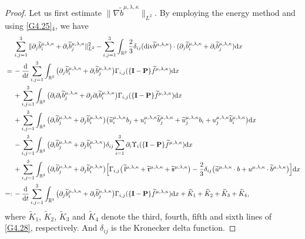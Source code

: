 \documentclass[reqno,11pt]{amsart}
\theoremstyle{plain}
\numberwithin{equation}{section}
\begin{document}
\begin{proof}
Let us first estimate $\|\nabla \widetilde{b}^{\mu,\lambda,\kappa}\|_{L^2}$. 
By employing the energy method and using \eqref{G4.25}$_4$, we have
\begin{align}\label{G4.28}
& \sum_{i, j=1}^3  \|  \partial_j \widetilde{b}^{\mu,\lambda,\kappa}_i+\partial_i
 \widetilde{b}^{\mu,\lambda,\kappa}_j  \|_{L^2}^2-\sum_{i, j=1}^3 \int_{\mathbb{R}^3} \frac{2}{3} \delta_{i j}   ({\rm div} 
 \widetilde{b}^{\mu,\lambda,\kappa})\cdot  
  (\partial_j \widetilde{b}^{\mu,\lambda,\kappa}_i
  +\partial_i \widetilde{b}^{\mu,\lambda,\kappa}_j ) \mathrm{d} x \nonumber\\
  =\,& -\frac{\mathrm{d}}{\mathrm{d} t} 
  \sum_{i, j=1}^3 \int_{\mathbb{R}^3}  
  \big(\partial_j \widetilde{b}^{\mu,\lambda,\kappa}_i
  +\partial_i \widetilde{b}^{\mu,\lambda,\kappa}_j \big)  
   \Gamma_{i, j}(\{\mathbf{I}-\mathbf{P}\} \widetilde{f}^{\mu,\lambda,\kappa}) \mathrm{d} x \nonumber\\
&  +\sum_{i, j=1}^3 \int_{\mathbb{R}^3}  
\big(\partial_i \partial_t \widetilde{b}^{\mu,\lambda,\kappa}_j
+\partial_j \partial_t \widetilde{b}^{\mu,\lambda,\kappa}_i\big)  
 \Gamma_{i, j}(\{\mathbf{I}-\mathbf{P}\} \widetilde{f}^{\mu,\lambda,\kappa}) \mathrm{d} x \nonumber\\
&   +\sum_{i, j=1}^3 \int_{\mathbb{R}^3}  
 \big(\partial_i \widetilde{b}^{\mu,\lambda,\kappa}_j+\partial_j 
 \widetilde{b}^{\mu,\lambda,\kappa}_i \big)   \big(\widetilde{u}^{\mu,\lambda,\kappa}_i 
 b_j+u^{\mu,\lambda,\kappa}_i \widetilde{b}^{\mu,\lambda,\kappa}_j
 +\widetilde{u}^{\mu,\lambda,\kappa}_j b_i+u^{\mu,\lambda,\kappa}_j\widetilde{b}^{\mu,\lambda,
 \kappa}_i \big) {\rm d}x\nonumber \\
&   -\sum_{i, j=1}^3 \int_{\mathbb{R}^3}  
 \big(\partial_i \widetilde{b}^{\mu,\lambda,\kappa}_j+\partial_j 
 \widetilde{b}^{\mu,\lambda,\kappa}_i \big)   \delta_{i j}\sum_{i=1}^3 \partial_i 
 \Upsilon_i(\{\mathbf{I}-\mathbf{P}\} \widetilde{f}^{\mu,\lambda,\kappa}){\rm d}x\nonumber \\
&   +\sum_{i, j=1}^3 \int_{\mathbb{R}^3}  
 \big(\partial_i \widetilde{b}^{\mu,\lambda,\kappa}_j+\partial_j 
 \widetilde{b}^{\mu,\lambda,\kappa}_i \big)  \Big[\Gamma_{i, j}
 \big(\,\widetilde{\mathfrak{l}}^{\mu,\lambda,\kappa}+\widetilde{\mathfrak{r}}^{\mu,\lambda,
 \kappa}+\widetilde{\mathfrak{s}}^{\mu,\lambda,\kappa}\big)-\frac{2}{3}\delta_{i j} 
 \big(\widetilde{u}^{\mu,\lambda,\kappa} 
\cdot b+u^{\mu,\lambda,\kappa}\cdot
\widetilde{b}^{\mu,\lambda,\kappa}\big)\Big]{\rm d}x\nonumber\\
 =:\,&-\frac{\mathrm{d}}{\mathrm{d} t} \sum_{i, j=1}^3 
 \int_{\mathbb{R}^3}  \big(\partial_j \widetilde{b}^{\mu,\lambda,\kappa}_i
 +\partial_i \widetilde{b}^{\mu,\lambda,\kappa}_j \big)  
  \Gamma_{i, j}(\{\mathbf{I}-\mathbf{P}\} \widetilde{f}^{\mu,\lambda,\kappa})
   \mathrm{d} x+\widetilde{K}_1+\widetilde{K}_2+\widetilde{K}_3+\widetilde{K}_4,
\end{align}
where $\widetilde{K}_1$, $\widetilde{K}_2$, $\widetilde{K}_3$ and $\widetilde{K}_4$ denote the third, fourth, fifth and sixth lines of 
\eqref{G4.28}, respectively. And $\delta_{ij}$ is the Kronecker delta function.


\end{proof}
\end{document}
